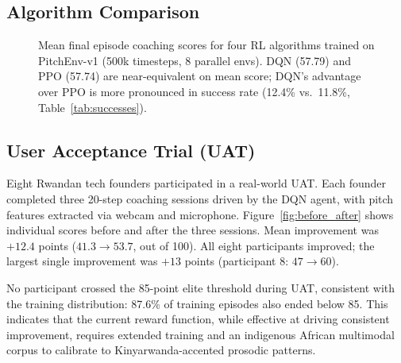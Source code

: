 \documentclass{article}
\begin{document}
\FloatBarrier
\subsection{Algorithm Comparison}

\begin{figure}[htbp]
\centering
{}
\caption{Mean final episode coaching scores for four RL algorithms
         trained on PitchEnv-v1 (500k timesteps, 8 parallel envs).
         DQN (57.79) and PPO (57.74) are near-equivalent on mean score;
         DQN's advantage over PPO is more pronounced in success rate
         (12.4\% vs.\ 11.8\%, Table~\ref{tab:successes}).}
\label{fig:rl_comparison}
\end{figure}

\FloatBarrier
\subsection{User Acceptance Trial (UAT)}

Eight Rwandan tech founders participated in a real-world UAT.
Each founder completed three 20-step coaching sessions driven by the
DQN agent, with pitch features extracted via webcam and microphone.
Figure~\ref{fig:before_after} shows individual scores before and after
the three sessions.
Mean improvement was $+12.4$ points ($41.3 \to 53.7$, out of 100).
All eight participants improved; the largest single improvement was
$+13$ points (participant 8: $47 \to 60$).

No participant crossed the 85-point elite threshold during UAT, consistent
with the training distribution: 87.6\% of training episodes also ended
below 85. This indicates that the current reward function, while effective
at driving consistent improvement, requires extended training and an
indigenous African multimodal corpus to calibrate to Kinyarwanda-accented
prosodic patterns.
\end{document}
